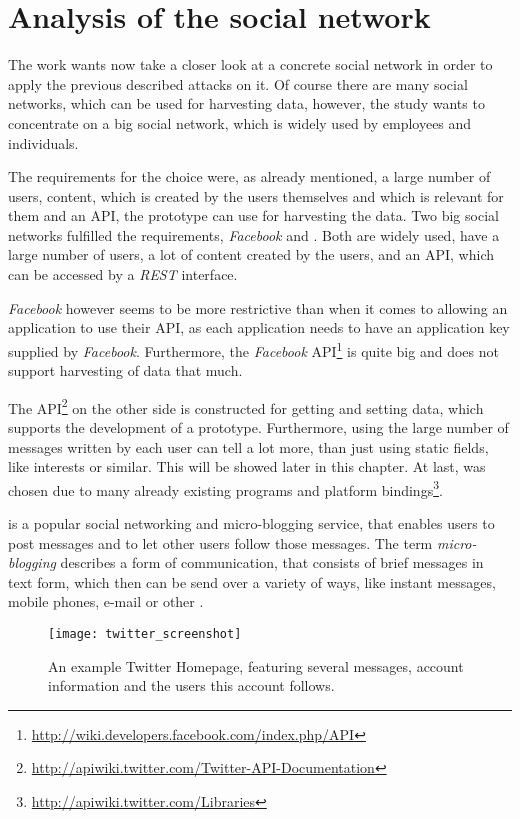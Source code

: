 \chapter{Analysis of the social network \Twitter}
\label{chap:analysis}

The work wants now take a closer look at a concrete social network in order to
apply the previous described attacks on it.  Of course there are many social
networks, which can be used for harvesting data, however, the study wants to
concentrate on a big social network, which is widely used by employees and
individuals.

The requirements for the choice were, as already mentioned, a large number of
users, content, which is created by the users themselves and which is
relevant for them and an API, the prototype can use for harvesting the data.
Two big social networks fulfilled the requirements, \textit{Facebook} and \Twitter. Both are
widely used, have a large number of users, a lot of content created by the
users, and an API, which can be accessed by a \textit{REST} interface.

\textit{Facebook} however seems to be more restrictive than \Twitter{} when it
comes to allowing an application to use their API, as each application needs to
have an application key supplied by \textit{Facebook}. Furthermore, the
\textit{Facebook}
API\footnote{\url{http://wiki.developers.facebook.com/index.php/API}} is quite
big and does not support harvesting of data that much.

The \Twitter{}
API\footnote{\url{http://apiwiki.twitter.com/Twitter-API-Documentation}} on the
other side is constructed for getting and setting data, which supports the
development of a prototype. Furthermore, using the large number of messages
written by each \Twitter{} user can tell a lot more, than just using static
fields, like interests or similar. This will be showed later in this chapter.
At last, \Twitter{} was chosen due to many already existing programs and
platform bindings\footnote{\url{http://apiwiki.twitter.com/Libraries}}.

\Twitter{} is a popular social networking and micro-blogging service, that
enables users to post messages and to let other users follow those messages.
The term \textit{micro-blogging} describes a form of communication, that
consists of brief messages in text form, which then can be send over a variety
of ways, like instant messages, mobile phones, e-mail or other \cite{java2007}.

\begin{figure}[hbt]
  \centering
  \texttt{[image: twitter\_screenshot]}
  \caption{An example Twitter Homepage, featuring several \Twitter{}
  messages, account information and the users this account
  follows.}\label{fig:twitter_screenshot}
\end{figure}

